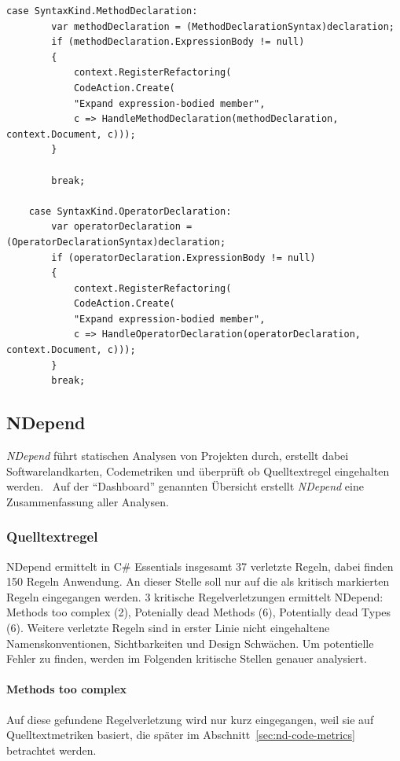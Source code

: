 \begin{minipage}{\textwidth}
	\begin{lstlisting}[caption={Visual Studio Medium Dublikat},
	label={lst:code-VSMediumDuplicate}]
	case SyntaxKind.MethodDeclaration:
		var methodDeclaration = (MethodDeclarationSyntax)declaration;
		if (methodDeclaration.ExpressionBody != null)
		{
			context.RegisterRefactoring(
			CodeAction.Create(
			"Expand expression-bodied member",
			c => HandleMethodDeclaration(methodDeclaration, context.Document, c)));
		}
		
		break;
		
	case SyntaxKind.OperatorDeclaration:
		var operatorDeclaration = (OperatorDeclarationSyntax)declaration;
		if (operatorDeclaration.ExpressionBody != null)
		{
			context.RegisterRefactoring(
			CodeAction.Create(
			"Expand expression-bodied member",
			c => HandleOperatorDeclaration(operatorDeclaration, context.Document, c)));
		}
		break;
	\end{lstlisting}
\end{minipage}

\subsection{NDepend}
\emph{NDepend} führt statischen Analysen von Projekten durch, erstellt dabei Softwarelandkarten, Codemetriken und überprüft ob Quelltextregel eingehalten werden.~\cite{ndepend} Auf der \enquote{Dashboard} genannten Übersicht erstellt \emph{NDepend} eine Zusammenfassung aller Analysen. 

\subsubsection{Quelltextregel}
NDepend ermittelt in C\# Essentials insgesamt 37 verletzte Regeln, dabei finden 150 Regeln Anwendung. An dieser Stelle soll nur auf die als kritisch markierten Regeln eingegangen werden. 3 kritische Regelverletzungen ermittelt NDepend: Methods too complex (2), Potenially dead Methods (6), Potentially dead Types (6). Weitere verletzte Regeln sind in erster Linie nicht eingehaltene Namenskonventionen, Sichtbarkeiten und Design Schwächen. Um potentielle Fehler zu finden, werden im Folgenden kritische Stellen genauer analysiert.

\paragraph{Methods too complex}
Auf diese gefundene Regelverletzung wird nur kurz eingegangen, weil sie auf Quelltextmetriken basiert, die später im Abschnitt~\ref{sec:nd-code-metrics} betrachtet werden.

